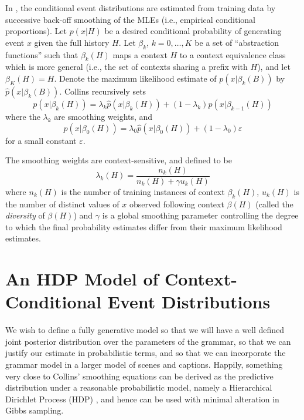 \documentclass[12pt,letterpaper]{report}
\begin{document}
In \citet{collins2003head}, the conditional event distributions are
estimated from training data by successive back-off smoothing of the
MLEs (i.e., empirical conditional proportions).  Let $p(x | H)$ be a desired conditional
probability of generating event $x$ given the full history $H$.  
Let $\beta_k$, $k = 0, \dots, K$ be a set of ``abstraction functions'' 
such that $\beta_k(H)$ maps a context $H$ to a context equivalence
class which is more general (i.e., the set of contexts sharing a
prefix with $H$), and let $\beta_K(H) = H$. Denote the maximum 
likelihood estimate of $p(x | \beta_k(B))$ by $\hat{p}(x \vert \beta_k(B))$.  Collins recursively sets
\begin{equation}
  \label{eq:smoothing-recursion}
  p(x | \beta_k(H)) = \lambda_k \hat{p}(x \vert \beta_k(H)) 
        + (1 - \lambda_k) p(x | \beta_{k-1}(H))
\end{equation}
where the $\lambda_k$ are smoothing weights, and
\begin{equation}
  \label{eq:smoothing-base-case}
  p(x | \beta_0(H)) = \lambda_0\hat{p}(x | \beta_0(H)) + (1 - \lambda_0) \varepsilon
\end{equation}
for a small constant $\varepsilon$.

The smoothing weights are context-sensitive, and defined to be
\begin{equation}
  \label{eq:lambda-definition}
  \lambda_k(H) = \frac{n_k(H)}{n_k(H) + \gamma u_k(H)}
\end{equation}
where $n_k(H)$ is the number of training instances of context
$\beta_k(H)$, $u_k(H)$ is the number of distinct values of $x$ 
observed following context $\beta(H)$ (called the {\em
  diversity} of $\beta(H)$) and $\gamma$ is a global
smoothing parameter controlling the degree to which the final
probability estimates differ from their maximum likelihood estimates. 

\section{An HDP Model of Context-Conditional Event Distributions}
\label{sec:hdp-smoothing}

We wish to define a fully generative model so
that we will have a well defined joint posterior distribution over the parameters of
the grammar, so that we can justify our estimate in probabilistic
terms, and so that we can incorporate the grammar model in a larger
model of scenes and captions.  Happily, something very close to 
Collins' smoothing equations can be derived
as the predictive distribution under a reasonable probabilistic model,
namely a Hierarchical Dirichlet Process (HDP)
\cite{teh2006hierarchical}, and hence can be used with minimal
alteration in Gibbs sampling.
\end{document}

